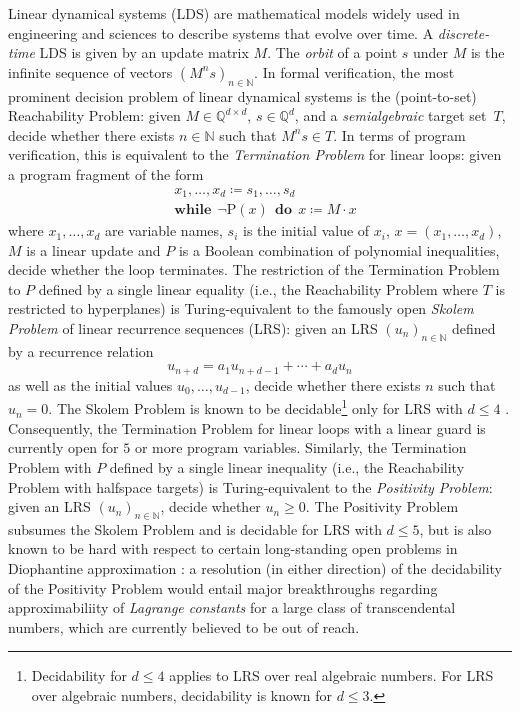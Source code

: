 \documentclass[a4paper,UKenglish,cleveref]{lipics-v2021}
\newcommand{\nat}{\mathbb{N}}
\newcommand{\rat}{\mathbb{Q}}
\begin{document}
Linear dynamical systems (LDS) are mathematical models widely used in engineering and sciences to describe systems that evolve over time.
A \emph{discrete-time} LDS is given by an update matrix $M$.
The \emph{orbit} of a point $s$ under $M$ is the infinite sequence of vectors $(M^n s)_{n\in\nat}$.
In formal verification, the most prominent decision problem of linear dynamical systems is the (point-to-set) Reachability Problem: given $M \in\rat^{d\times d}$, $s \in \rat^d$, and a \emph{semialgebraic} target set~$T$, decide whether there exists $n \in \nat$ such that $M^ns \in T$.
In terms of program verification, this is equivalent to the \emph{Termination Problem} for linear loops: given a program fragment of the form
\begin{align*}
	&x_1,\ldots,x_d \coloneqq s_1,\ldots,s_d\\
	&\mathbf{while} \:\: \lnot \mathrm{P}(x) \:\: \mathbf{do} \:\: x \coloneqq M \cdot x
\end{align*}
where $x_1,\ldots,x_d$ are variable names, $s_i$ is the initial value of $x_i$, $x = (x_1,\ldots,x_d)$, $M$ is a linear update and $P$ is a Boolean combination of polynomial inequalities, decide whether the loop terminates.
The restriction of the Termination Problem to $P$ defined by a single linear equality (i.e., the Reachability Problem where $T$ is restricted to hyperplanes) is Turing-equivalent to the famously open \emph{Skolem Problem} of linear recurrence sequences (LRS): given an LRS $(u_n)_{n\in\nat}$ defined  by a recurrence relation
\[
u_{n+d} = a_1u_{n+d-1} + \cdots + a_d u_n
\]
as well as the initial values $u_0,\ldots,u_{d-1}$, decide whether there exists $n$ such that $u_n = 0$.
The Skolem Problem is known to be decidable\footnote{Decidability for $d \le 4$ applies to LRS over real algebraic numbers. For LRS over algebraic numbers, decidability is known for $d \le 3$.} only for LRS with $d \le 4$ \cite{mignotte-shorey-tijdeman-skolem}.
Consequently, the Termination Problem for linear loops with a linear guard is currently open for $5$ or more program variables.
Similarly, the Termination Problem with $P$ defined by a single linear inequality (i.e., the Reachability Problem with halfspace targets) is Turing-equivalent to the \emph{Positivity Problem}: given an LRS $(u_n)_{n\in\nat}$, decide whether $u_n \ge 0$.
The Positivity Problem subsumes the Skolem Problem \cite[Chap.~2.5]{karimov-thesis} and is decidable for LRS with $d \le 5$, but is also known to be hard with respect to certain long-standing open problems in Diophantine approximation \cite{joel-pos-low-dim}: a resolution (in either direction) of the decidability of the Positivity Problem would entail major breakthroughs regarding approximabiliity of \emph{Lagrange constants} for a large class of transcendental numbers, which are currently believed to be out of reach.
\end{document}
